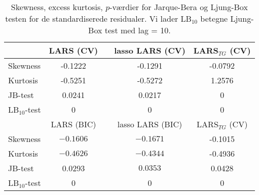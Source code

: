 \begin{table}
\center
\begin{tabular}{lcccc} 
\toprule
& LARS (CV) && lasso LARS  (CV) & LARS$_{TG}$ (CV) \\ \midrule
Skewness & -0.1222 && -0.1291 & -0.0792   \\
Kurtosis & -0.5251  && -0.5272 & 1.2576 \\
JB-test & 0.0241 &&  0.0217 & 0 \\
LB$_{10}$-test &0 && 0  & 0  \\  \bottomrule \toprule
& LARS (BIC) && lasso LARS (BIC) &  LARS$_{TG}$ (CV) \\ \midrule
Skewness & $-0.1606$  && $-0.1671$   & -0.1015 \\
Kurtosis &   $-0.4626$ && $-0.4344 $ & -0.4936  \\
JB-test & 0.0293 &&  $0.0353$ &  0.0428\\
LB$_{10}$-test & 0 && 0  & 0\\  \bottomrule 
\end{tabular}
\caption{Skewness, excess kurtosis, $p$-værdier for Jarque-Bera og Ljung-Box testen for de standardiserede residualer. Vi lader LB$_{10}$ betegne Ljung-Box test med lag = 10. } \label{tab:lars_kryds_res_tab}
\end{table}